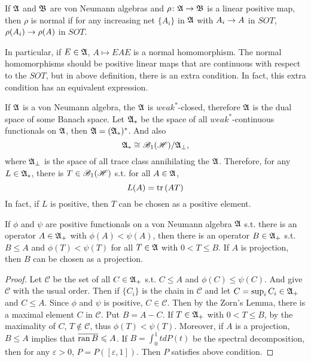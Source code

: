 \begin{defn}
	If $\mathfrak{A}$ and $\mathfrak{B}$ are von Neumann algebras and $\rho \colon \mathfrak{A} \rightarrow \mathfrak{B}$ is a linear positive map, then $\rho$ is normal if for any increasing net $\{A_i\}$ in $\mathfrak{A}$ with $A_i \rightarrow A$ in $SOT$, $\rho(A_i) \rightarrow \rho(A)$ in $SOT$.
\end{defn}
\begin{rem}
	In particular, if $E \in \mathfrak{A}$, $A \mapsto EAE$ is a normal homomorphism. The normal homomorphisms should be positive linear maps that are continuous with respect to the $SOT$, but in above definition, there is an extra condition. In fact, this extra condition has an equivalent expression.
\end{rem}

If $\mathfrak{A}$ is a von Neumann algebra, the $\mathfrak{A}$ is $weak^*$-closed, therefore $\mathfrak{A}$ is the dual space of some Banach space. Let $\mathfrak{A}_*$ be the space of all $weak^*$-continuous functionals on $\mathfrak{A}$, then $\mathfrak{A}  = (\mathfrak{A}_*)^*$. And also 
\begin{equation*}
	\mathfrak{A}_* \cong \mathscr{B}_{1}\mathscr{(H)} / \mathfrak{A}_{\bot},
\end{equation*}
where $\mathfrak{A}_{\bot}$ is the space of all trace class annihilating the $\mathfrak{A}$. Therefore, for any $L \in \mathfrak{A}_*$, there is $T \in \mathscr{B}_{1}\mathscr{(H)}$ s.t. for all $A \in \mathfrak{A}$, 
\begin{equation*}
	L(A) = \operatorname{tr}{(AT)}
\end{equation*}
In fact, if $L$ is positive, then $T$ can be chosen as a positive element.

\begin{lem}
	If $\phi$ and $\psi$ are positive functionals on a von Neumann algebra $\mathfrak{A}$ s.t. there is an operator $A \in \mathfrak{A}_+$ with $\phi(A)  < \psi(A)$, then there is an operator $B \in \mathfrak{A}_+$ s.t. $B \leqslant A$ and $\phi(T) < \psi(T)$ for all $T \in \mathfrak{A}$ with $0 <  T \leqslant  B$. If $A$ is projection, then $B$ can be chosen as a projection.
\end{lem}
\begin{proof}
	Let $\mathcal{C}$ be the set of all $C \in \mathfrak{A}_+$ s.t. $C \leqslant A$ and $\phi(C) \leqslant \psi(C)$. And give $\mathcal{C}$ with the usual order. Then if $\{C_i\}$ is the chain in $\mathcal{C}$ and let $C = \sup_i C_i \in \mathfrak{A}_+$  and $C \leqslant A$. Since $\phi$ and $\psi$ is positive, $C \in \mathcal{C}$. Then by the Zorn's Lemma, there is a maximal element $C$ in $\mathcal{C}$. Put $B = A-C$. If $T \in \mathfrak{A}_+$ with $0 < T \leqslant B$, by the maximality of $C$, $T \notin \mathcal{C}$, thus $\phi(T) < \psi(T)$. Moreover, if $A$ is a projection, $B \leqslant A$ implies that $\overline{\operatorname{ran}{B}} \leqslant A$. If $B = \int_0^1 t dP(t)$ be the spectral decomposition, then for any $\varepsilon >  0$, $P = P([\varepsilon,1])$. Then $P$ satisfies above condition.
\end{proof}

